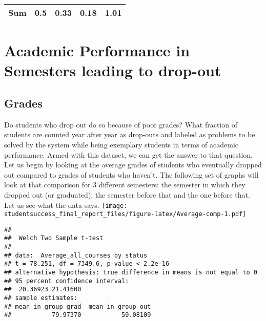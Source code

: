 \documentclass[]{book}
\theoremstyle{definition}
\theoremstyle{definition}
\theoremstyle{remark}
\begin{document}
\begin{longtable}[]{@{}ccccc@{}}
\begin{minipage}[t]{0.12\columnwidth}
\textbf{Sum}\strut
\end{minipage} & \begin{minipage}[t]{0.06\columnwidth}\centering\strut
0.5\strut
\end{minipage} & \begin{minipage}[t]{0.06\columnwidth}\centering\strut
0.33\strut
\end{minipage} & \begin{minipage}[t]{0.06\columnwidth}\centering\strut
0.18\strut
\end{minipage} & \begin{minipage}[t]{0.06\columnwidth}\centering\strut
1.01\strut
\end{minipage}\tabularnewline
\bottomrule
\end{longtable}

\section{Academic Performance in Semesters leading to
drop-out}\label{academic-performance-in-semesters-leading-to-drop-out}

\subsection{Grades}\label{grades}

Do students who drop out do so because of poor grades? What fraction of
students are counted year after year as drop-outs and labeled as
problems to be solved by the system while being exemplary students in
terms of academic performance. Armed with this dataset, we can get the
answer to that question. Let us begin by looking at the average grades
of students who eventually dropped out compared to grades of students
who haven't. The following set of graphs will look at that comparison
for 3 different semesters: the semester in which they dropped out (or
graduated), the semester before that and the one before that. Let us see
what the data says.
\texttt{[image: studentsuccess\_final\_report\_files/figure-latex/Average-comp-1.pdf]}

\begin{verbatim}
## 
##  Welch Two Sample t-test
## 
## data:  Average_all_courses by status
## t = 78.251, df = 7349.6, p-value < 2.2e-16
## alternative hypothesis: true difference in means is not equal to 0
## 95 percent confidence interval:
##  20.36923 21.41600
## sample estimates:
## mean in group grad  mean in group out 
##           79.97370           59.08109
\end{verbatim}
\end{document}
